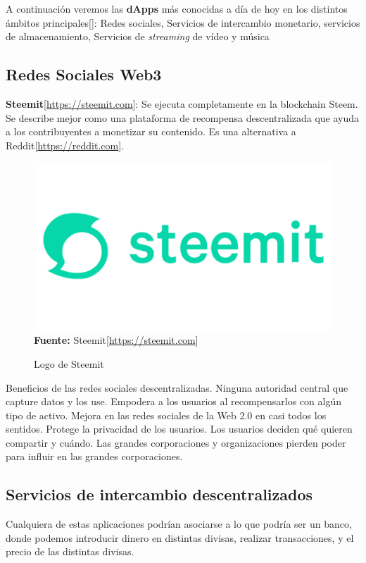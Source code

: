 A continuación veremos las \textbf{dApps} más conocidas a día de hoy en los
distintos ámbitos principales[\cite{aplicaciones-descentralizadas}]: Redes
sociales, Servicios de intercambio monetario, servicios de almacenamiento,
Servicios de \textit{streaming} de vídeo y música

\label{dApps}
\subsection*{Redes Sociales Web3}
\label{webs-socialNetworks}
\textbf{Steemit}[\url{https://steemit.com}]: Se ejecuta completamente en la blockchain
Steem. Se describe mejor como una plataforma de recompensa descentralizada que
ayuda a los contribuyentes a monetizar su contenido. Es una alternativa a
Reddit[\url{https://reddit.com}].
\begin{figure}[htb!]
    \caption{Logo de Steemit}
    \label{fig:steemit}
    \centering
    \includegraphics[scale=0.30]{./Ilustraciones/logos/steemit-logo.png}\\
    \textbf{Fuente:} Steemit[\url{https://steemit.com}]
\end{figure}
Beneficios de las redes sociales descentralizadas. Ninguna autoridad central
que capture datos y los use. Empodera a los usuarios al recompensarlos con
algún tipo de activo. Mejora en las redes sociales de la Web 2.0 en casi todos
los sentidos. Protege la privacidad de los usuarios. Los usuarios deciden qué
quieren compartir y cuándo. Las grandes corporaciones y organizaciones pierden
poder para influir en las grandes corporaciones.

\subsection*{Servicios de intercambio descentralizados}
\label{webs-finanzas}
Cualquiera de estas aplicaciones podrían asociarse a lo que podría ser un
banco, donde podemos introducir dinero en distintas divisas, realizar
transacciones, y el precio de las distintas divisas.

